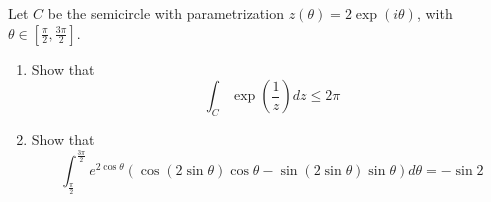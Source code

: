 \documentclass{article}
\renewcommand{\exp}[1]{\operatorname{exp}\left(#1\right)}
\begin{document}
    \begin{tcolorbox}[title=Exercise 6]
        Let $C$ be the semicircle with parametrization $z(\theta) = 2\exp{i\theta}$, with $\theta \in [\frac{\pi}{2}, \frac{3\pi}{2}]$.
        \begin{enumerate}[label=(\alph*)]
            \item Show that
            \begin{equation*}
                \int_C{\exp{\frac{1}{z}}}dz \leq 2\pi
            \end{equation*}
            \item Show that
            \begin{equation*}
                \int_{\frac{\pi}{2}}^{\frac{3\pi}{2}} e^{2\cos{\theta}}(\cos(2\sin{\theta})\cos{\theta} - \sin(2\sin{\theta})\sin{\theta}) d\theta = -\sin{2}
            \end{equation*}
        \end{enumerate}
    \end{tcolorbox}
\end{document}
